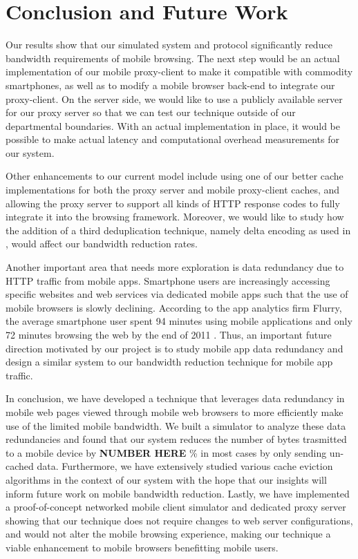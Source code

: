\section{Conclusion and Future Work}
\label{sec:conclusion}
Our results show that our simulated system and protocol significantly reduce bandwidth requirements of mobile browsing. The next step would be an actual implementation of our mobile proxy-client to make it compatible with commodity smartphones, as well as to modify a mobile browser back-end to integrate our proxy-client. On the server side, we would like to use a publicly available server for our proxy server so that we can test our technique outside of our departmental boundaries. With an actual implementation in place, it would be possible to make actual latency and computational overhead measurements for our system.

Other enhancements to our current model include using one of our better cache implementations for both the proxy server and mobile proxy-client caches, and allowing the proxy server to support all kinds of HTTP response codes to fully integrate it into the browsing framework. Moreover, we would like to study how the addition of a third deduplication technique, namely delta encoding as used in \cite{delta}, would affect our bandwidth reduction rates.

Another important area that needs more exploration is data redundancy due to HTTP traffic from mobile apps. Smartphone users are increasingly accessing specific websites and web services via dedicated mobile apps such that the use of mobile browsers is slowly declining. According to the app analytics firm Flurry, the average smartphone user spent 94 minutes using mobile applications and only 72 minutes browsing the web by the end of 2011 \cite{flurry}. Thus, an important future direction motivated by our project is to study mobile app data redundancy and design a similar system to our bandwidth reduction technique for mobile app traffic.

In conclusion, we have developed a technique that leverages data redundancy in mobile web pages viewed through mobile web browsers to more efficiently make use of the limited mobile bandwidth. We built a simulator to analyze these data redundancies and found that our system reduces the number of bytes trasmitted to a mobile device by \textbf{NUMBER HERE} \% in most cases by only sending un-cached data. 
Furthermore, we have extensively studied various cache eviction algorithms in the context of our system with the hope that our insights will inform future work on mobile bandwidth reduction.
Lastly, we have implemented a proof-of-concept networked mobile client simulator and dedicated proxy server showing that our technique does not require changes to web server configurations, and would not alter the mobile browsing experience, making our technique a viable enhancement to mobile browsers benefitting mobile users.



